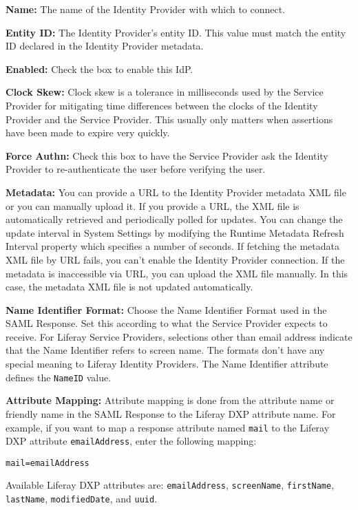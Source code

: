 \textbf{Name:} The name of the Identity Provider with which to connect.

\textbf{Entity ID:} The Identity Provider's entity ID. This value must
match the entity ID declared in the Identity Provider metadata.

\textbf{Enabled:} Check the box to enable this IdP.

\textbf{Clock Skew:} Clock skew is a tolerance in milliseconds used by
the Service Provider for mitigating time differences between the clocks
of the Identity Provider and the Service Provider. This usually only
matters when assertions have been made to expire very quickly.

\textbf{Force Authn:} Check this box to have the Service Provider ask
the Identity Provider to re-authenticate the user before verifying the
user.

\textbf{Metadata:} You can provide a URL to the Identity Provider
metadata XML file or you can manually upload it. If you provide a URL,
the XML file is automatically retrieved and periodically polled for
updates. You can change the update interval in System Settings by
modifying the Runtime Metadata Refresh Interval property which specifies
a number of seconds. If fetching the metadata XML file by URL fails, you
can't enable the Identity Provider connection. If the metadata is
inaccessible via URL, you can upload the XML file manually. In this
case, the metadata XML file is not updated automatically.

\textbf{Name Identifier Format:} Choose the Name Identifier Format used
in the SAML Response. Set this according to what the Service Provider
expects to receive. For Liferay Service Providers, selections other than
email address indicate that the Name Identifier refers to screen name.
The formats don't have any special meaning to Liferay Identity
Providers. The Name Identifier attribute defines the \texttt{NameID}
value.

\textbf{Attribute Mapping:} Attribute mapping is done from the attribute
name or friendly name in the SAML Response to the Liferay DXP attribute
name. For example, if you want to map a response attribute named
\texttt{mail} to the Liferay DXP attribute \texttt{emailAddress}, enter
the following mapping:

\begin{verbatim}
mail=emailAddress
\end{verbatim}

Available Liferay DXP attributes are: \texttt{emailAddress},
\texttt{screenName}, \texttt{firstName}, \texttt{lastName},
\texttt{modifiedDate}, and \texttt{uuid}.

